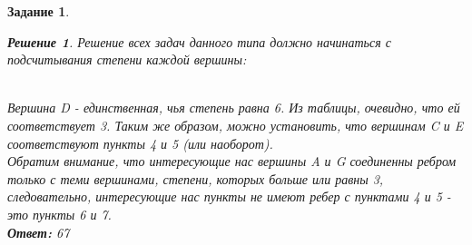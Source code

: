 \documentclass[12pt]{article}
\theoremstyle{problem_style}
\newtheorem{problem}{Задание}[subsection]
\newtheorem{solution}{Решение}[subsection]
\begin{document}
\begin{problem}
\begin{solution}
Решение всех задач данного типа должно начинаться с подсчитывания степени каждой вершины:
\begin{figure}[h]
    \centering
\end{figure}\\
Вершина D - единственная, чья степень равна 6. Из таблицы, очевидно, что ей соответствует 3. Таким же образом, можно установить, что вершинам C и E соответствуют пункты 4 и 5 (или наоборот).\\
Обратим внимание, что интересующие нас вершины A и G соединенны ребром только с теми вершинами, степени, которых больше или равны 3, следовательно, интересующие нас пункты не имеют ребер с пунктами 4 и 5 - это пункты 6 и 7.\\
\textbf{Ответ:} 67
\end{solution}
\break
\end{problem}
\end{document}
